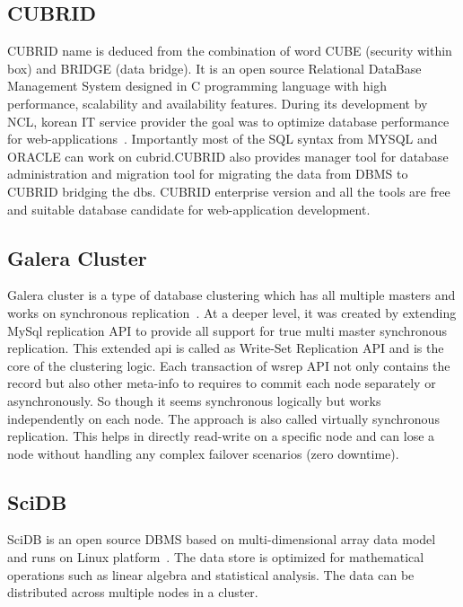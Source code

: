 \subsection{CUBRID}

CUBRID name is deduced from the combination of word CUBE (security
within box) and BRIDGE (data bridge).  It is an open source Relational
DataBase Management System designed in C programming language with
high performance, scalability and availability features. During its
development by NCL, korean IT service provider the goal was to
optimize database performance for
web-applications~\cite{www-cubrid}. Importantly most of the SQL syntax
from MYSQL and ORACLE can work on cubrid.CUBRID also provides manager
tool for database administration and migration tool for migrating the
data from DBMS to CUBRID bridging the dbs.  CUBRID enterprise version
and all the tools are free and suitable database candidate for
web-application development.

     \pv

\subsection{Galera Cluster}

Galera cluster is a type of database clustering which has all multiple
masters and works on synchronous
replication~\cite{www-galera-cluster}.  At a deeper level, it was
created by extending MySql replication API to provide all support for
true multi master synchronous replication.  This extended api is
called as Write-Set Replication API and is the core of the clustering
logic.  Each transaction of wsrep API not only contains the record but
also other meta-info to requires to commit each node separately or
asynchronously. So though it seems synchronous logically but works
independently on each node.  The approach is also called virtually
synchronous replication. This helps in directly read-write on a
specific node and can lose a node without handling any complex
failover scenarios (zero downtime).

     \pv

\subsection{SciDB}

SciDB is an open source DBMS based on multi-dimensional array data
model and runs on Linux platform~\cite{ercimnews}. The data store is
optimized for mathematical operations such as linear algebra and
statistical analysis. The data can be distributed across multiple
nodes in a cluster.


